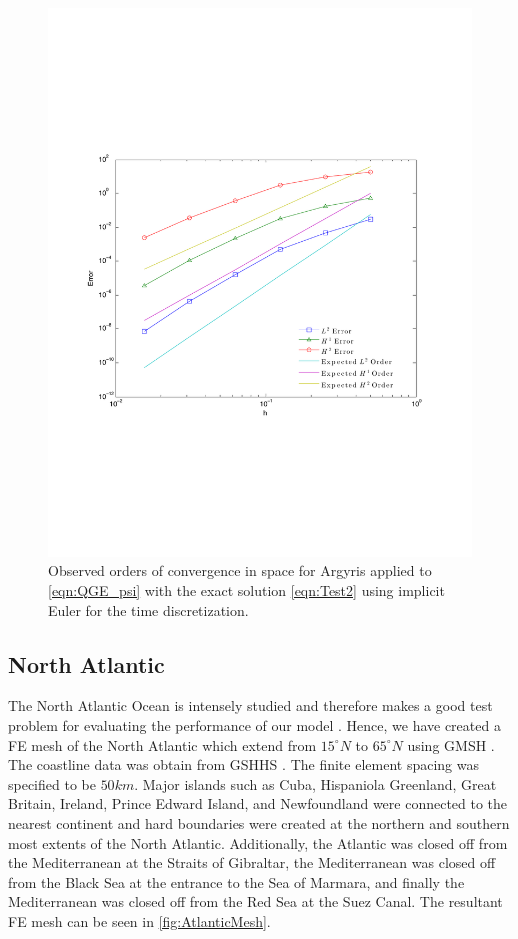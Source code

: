 \begin{figure}
  \begin{center}
    \includegraphics[scale=0.6]{expsinSpaceConvergence.pdf}
    \caption{Observed orders of convergence in space for Argyris applied to
      \eqref{eqn:QGE_psi} with the exact solution \eqref{eqn:Test2} using
      implicit Euler for the time discretization.}
  \label{fig:Test2Space}
  \end{center}
\end{figure}

\subsection{North Atlantic}
The North Atlantic Ocean is intensely studied and therefore makes a good test
problem for evaluating the performance of our model \cite{Myers}. Hence, we have
created a FE mesh of the North Atlantic which extend from $15^\circ N$ to $65^\circ
N$ using GMSH \cite{GMSH}. The coastline data was obtain from GSHHS \cite{GSHHS}.
The finite element spacing was specified to be {\color{red} $50km$}.  Major
islands such as Cuba, Hispaniola Greenland, Great Britain, Ireland, Prince
Edward Island, and Newfoundland were connected to the nearest continent and hard
boundaries were created at the northern and southern most extents of the North
Atlantic. Additionally, the Atlantic was closed off from the Mediterranean at
the Straits of Gibraltar, the Mediterranean was closed off from the Black
Sea at the entrance to the Sea of Marmara, and finally the Mediterranean was
closed off from the Red Sea at the Suez Canal. The resultant FE mesh can be seen in
\autoref{fig:AtlanticMesh}.

